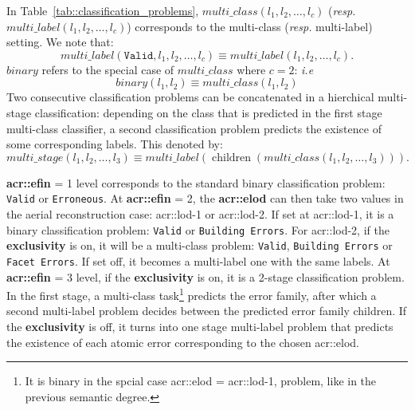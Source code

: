         In Table~\ref{tab::classification_problems}, $multi\_class(l_1, l_2, \dots, l_c)$ (\textit{resp.} $multi\_label(l_1, l_2, \dots, l_c)$) corresponds to the multi-class (\textit{resp.} multi-label) setting.
        We note that:
        \begin{equation*}
            multi\_label(\texttt{Valid}, l_1, l_2, \dots, l_c) \equiv multi\_label(l_1, l_2, \dots, l_c).
        \end{equation*}
        $binary$ refers to the special case of $multi\_class$ where $c = 2$: \textit{i.e}
        \begin{equation*}
            binary(l_1, l_2) \equiv multi\_class(l_1, l_2)
        \end{equation*}
        Two consecutive classification problems can be concatenated in a hierchical multi-stage classification:
        depending on the class that is predicted in the first stage multi-class classifier, a second classification problem predicts the existence of some corresponding labels.
        This denoted by:
        \begin{equation*}
            multi\_stage(l_1, l_2, \dots, l_3) \equiv multi\_label(\operatorname{children}(multi\_class(l_1, l_2, \dots, l_3))).
        \end{equation*}
            
        \textbf{\gls{acr::efin}} = 1 level corresponds to the standard binary classification problem: \texttt{Valid} or \texttt{Erroneous}.
        At \textbf{\gls{acr::efin}} = 2, the \textbf{\gls{acr::elod}} can then take two values in the aerial reconstruction case: \gls{acr::lod}-1 or \gls{acr::lod}-2.
        If set at \gls{acr::lod}-1, it is a binary classification problem: \texttt{Valid} or \texttt{Building Errors}.
        For \gls{acr::lod}-2, if the \textbf{exclusivity} is on, it will be a multi-class problem: \texttt{Valid}, \texttt{Building Errors} or \texttt{Facet Errors}.
        If set off, it becomes a multi-label one with the same labels.
        At \textbf{\gls{acr::efin}} = 3 level, if the \textbf{exclusivity} is on, it is a 2-stage classification problem.
        In the first stage, a multi-class task\footnote{It is binary in the spcial case \gls{acr::elod} = \gls{acr::lod}-1, problem, like in the previous semantic degree.}
        predicts the error family, after which a second multi-label problem decides between the predicted error family children.
        If the \textbf{exclusivity} is off, it turns into one stage multi-label problem that predicts the existence of each atomic error corresponding to the chosen \gls{acr::elod}.
    
